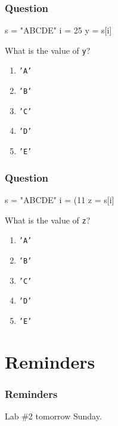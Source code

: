 \documentclass[11pt]{beamer}
\begin{document}
\begin{frame}[fragile]
  \frametitle{Question}
  \Enlarge

  \begin{semiverbatim}
s = "ABCDE"
i = 25 %
y = s[i]
  \end{semiverbatim}

  What is the value of \texttt{y}?
  \begin{enumerate}[label=\Alph*]
  \item  \texttt{'A'}
  \item  \texttt{'B'}
  \item  \texttt{'C'}
  \item  \texttt{'D'}
  \item  \texttt{'E'}
  \end{enumerate}
\end{frame}

\begin{frame}[fragile]
  \frametitle{Question}
  \Enlarge

  \begin{semiverbatim}
s = "ABCDE"
i = (11 %
z = s[i]
  \end{semiverbatim}

  What is the value of \texttt{z}?
  \begin{enumerate}[label=\Alph*]
  \item  \texttt{'A'}
  \item  \texttt{'B'}
  \item  \texttt{'C'}
  \item  \texttt{'D'}
  \item  \texttt{'E'}
  \end{enumerate}
\end{frame}

\section{Reminders}

\begin{frame}
  \frametitle{Reminders}
  \Enlarge

  \begin{itemize}
  \myitem  Lab \#2 tomorrow Sunday. 
  \end{itemize}
\end{frame}
\end{document}
